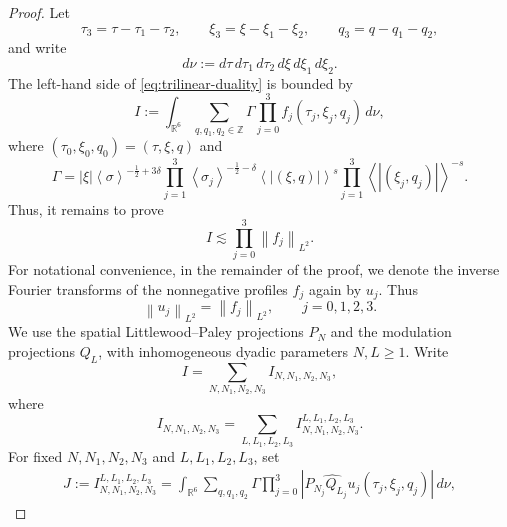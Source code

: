\documentclass[12pt,oneside,reqno]{amsart}
\numberwithin{equation}{section}
\theoremstyle{plain}
\def\R{{\mathbb R}}
\def\Z{{\mathbb Z}}
\newcommand{\abs}[1]{%
    \left|#1\right|%
}
\newcommand{\inp}[1]{%
    \left\langle #1\right\rangle
}
\newcommand{\Lpn}[2]{%
    \left\lVert #1\right\rVert_{L^{#2}}%
}
\newcommand{\Fh}[1]{\widehat{#1}}
\newcommand{\Ns}{{N,N_1,N_2,N_3}}
\newcommand{\Ls}{{L,L_1,L_2,L_3}}
\begin{document}
\begin{proof}
Let
\begin{equation}
    \tau_3=\tau-\tau_1-\tau_2,
    \qquad
    \xi_3=\xi-\xi_1-\xi_2,
    \qquad
    q_3=q-q_1-q_2,
\end{equation}
and write
\begin{equation}
    d\nu
    :=
    d\tau\,d\tau_1\,d\tau_2\,
    d\xi\,d\xi_1\,d\xi_2.
\end{equation}
The left-hand side of \eqref{eq:trilinear-duality} is bounded by
\begin{equation}
\label{eq:duality-integral-I}
    I
    :=
    \int_{\R^6}
    \sum_{q,q_1,q_2\in\Z}
    \Gamma
    \prod_{j=0}^3
    f_j(\tau_j,\xi_j,q_j)
    \,d\nu,
\end{equation}
where $(\tau_0,\xi_0,q_0)=(\tau,\xi,q)$ and
\begin{equation}
\label{TheGamma}
    \Gamma
    =
    \abs{\xi}
    \inp{\sigma}^{-\frac12+3\delta}
    \prod_{j=1}^3
    \inp{\sigma_j}^{-\frac12-\delta}
    \inp{\abs{(\xi,q)}}^s
    \prod_{j=1}^3
    \inp{\abs{(\xi_j,q_j)}}^{-s}.
\end{equation}
Thus, it remains to prove
\begin{equation}
\label{TheSufficeToProve}
    I
    \lesssim
    \prod_{j=0}^3
    \Lpn{f_j}{2}.
\end{equation}
For notational convenience, in the remainder of the proof, we denote the inverse Fourier transforms of the nonnegative profiles $f_j$
again by $u_j$. Thus
\begin{equation}
    \Lpn{u_j}{2}
    =
    \Lpn{f_j}{2},
    \qquad
    j=0,1,2,3.
\end{equation}
We use the spatial Littlewood--Paley projections $P_N$ and the
modulation projections $Q_L$, with inhomogeneous dyadic parameters
$N,L\geq1$. Write
\begin{equation}
    I
    =
    \sum_{\Ns}I_{\Ns},
\end{equation}
where
\begin{equation}
     I_{\Ns}
    =
    \sum_{\Ls}I_{\Ns}^{\Ls}.
\end{equation}
For fixed $\Ns$ and $\Ls$, set
\begin{equation}
\label{TheMain-INs}
\begin{aligned}
    J
    :=
    I_{\Ns}^{\Ls}
    =
    \int_{\R^6}
    \sum_{q,q_1,q_2}
    \Gamma
    \prod_{j=0}^3
    \abs{
        \Fh{
            P_{N_j}Q_{L_j}u_j
        }(\tau_j,\xi_j,q_j)
    }
    \,d\nu,
\end{aligned}
\end{equation}

\end{proof}
\end{document}
